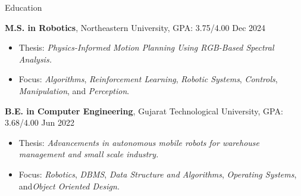 \documentclass{resume}
\newcommand{\smallspace}{\hspace{0.2em}}
\begin{document}
\fancyheadoffset[RO]{5em}
\fancyfootoffset[RO]{0cm}
\thispagestyle{firstpage}
\vspace{-10pt}
\begin{rSection}{Education}


{\textbf {M.S. in Robotics}}, Northeastern University, GPA: 3.75/4.00 \hfill {Dec 2024} 
 
\begin{itemize}
  \item[] \vspace{-0.5em} \hspace{-1.0em} Thesis: \emph{Physics-Informed Motion Planning Using RGB-Based Spectral Analysis.}
  \item[] \vspace{-0.5em} \hspace{-1.0em} Focus: \emph{Algorithms}, \smallspace \emph{Reinforcement Learning}, \smallspace \emph{Robotic Systems}, \smallspace \emph{Controls}, \smallspace \emph{Manipulation}, \smallspace and \smallspace \emph{Perception}.
\end{itemize}


{\bf B.E. in Computer Engineering}, Gujarat Technological University, GPA: 3.68/4.00 \hfill {Jun 2022} 
\begin{itemize}
    \item[] \vspace{-0.5em} \hspace{-1.0em} Thesis: \emph{Advancements in autonomous mobile robots for warehouse management and small scale industry.}
    \item[] \vspace{-0.5em} \hspace{-1.0em} Focus: \emph{Robotics}, \smallspace \emph{DBMS}, \smallspace \emph{Data Structure and Algorithms}, \smallspace \emph{Operating Systems}, \smallspace and\smallspace \emph{Object Oriented Design.}
\end{itemize}
\end{rSection}
\vspace{-3mm}
\end{document}
